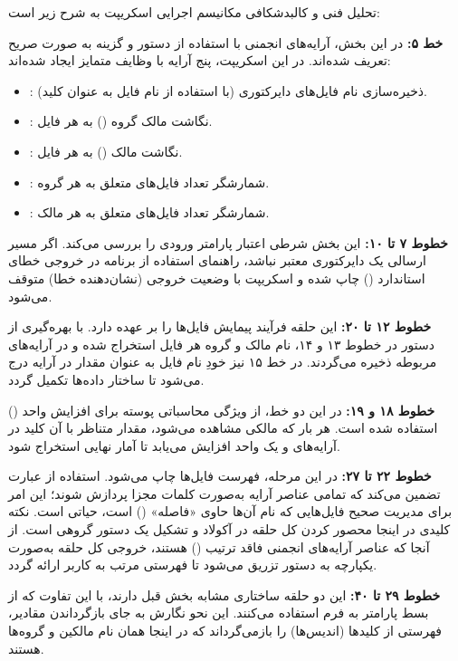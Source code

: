 تحلیل فنی و کالبدشکافی مکانیسم اجرایی اسکریپت  به شرح زیر است:

\textbf{خط ۵:} در این بخش، آرایه‌های انجمنی با استفاده از دستور  و گزینه  به صورت صریح تعریف شده‌اند. در این اسکریپت، پنج آرایه با وظایف متمایز ایجاد شده‌اند:

\begin{itemize}
  \item {}: ذخیره‌سازی نام فایل‌های دایرکتوری (با استفاده از نام فایل به عنوان کلید).
  \item {}: نگاشت مالک گروه () به هر فایل.
  \item {}: نگاشت مالک () به هر فایل.
  \item {}: شمارشگر تعداد فایل‌های متعلق به هر گروه.
  \item {}: شمارشگر تعداد فایل‌های متعلق به هر مالک.
\end{itemize}

\textbf{خطوط ۷ تا ۱۰:} این بخش شرطی اعتبار پارامتر ورودی را بررسی می‌کند. اگر مسیر ارسالی یک دایرکتوری معتبر نباشد، راهنمای استفاده از برنامه در خروجی خطای استاندارد () چاپ شده و اسکریپت با وضعیت خروجی  (نشان‌دهنده خطا) متوقف می‌شود.

\textbf{خطوط ۱۲ تا ۲۰:} این حلقه فرآیند پیمایش فایل‌ها را بر عهده دارد. با بهره‌گیری از دستور  در خطوط ۱۳ و ۱۴، نام مالک و گروه هر فایل استخراج شده و در آرایه‌های مربوطه ذخیره می‌گردند. در خط ۱۵ نیز خودِ نام فایل به عنوان مقدار در آرایه  درج می‌شود تا ساختار داده‌ها تکمیل گردد.

\textbf{خطوط ۱۸ و ۱۹:} در این دو خط، از ویژگی محاسباتی پوسته برای افزایش واحد () استفاده شده است. هر بار که مالکی مشاهده می‌شود، مقدار متناظر با آن کلید در آرایه‌های  و  یک واحد افزایش می‌یابد تا آمار نهایی استخراج شود.

\textbf{خطوط ۲۲ تا ۲۷:} در این مرحله، فهرست فایل‌ها چاپ می‌شود. استفاده از عبارت  تضمین می‌کند که تمامی عناصر آرایه به‌صورت کلمات مجزا پردازش شوند؛ این امر برای مدیریت صحیح فایل‌هایی که نام آن‌ها حاوی «فاصله» () است، حیاتی است. نکته کلیدی در اینجا محصور کردن کل حلقه در آکولاد و تشکیل یک دستور گروهی است. از آنجا که عناصر آرایه‌های انجمنی فاقد ترتیب () هستند، خروجی کل حلقه به‌صورت یکپارچه به دستور  تزریق می‌شود تا فهرستی مرتب به کاربر ارائه گردد.

\textbf{خطوط ۲۹ تا ۴۰:} این دو حلقه ساختاری مشابه بخش قبل دارند، با این تفاوت که از بسط پارامتر به فرم  استفاده می‌کنند. این نحو نگارش به جای بازگرداندن مقادیر، فهرستی از کلیدها (اندیس‌ها) را بازمی‌گرداند که در اینجا همان نام مالکین و گروه‌ها هستند.

